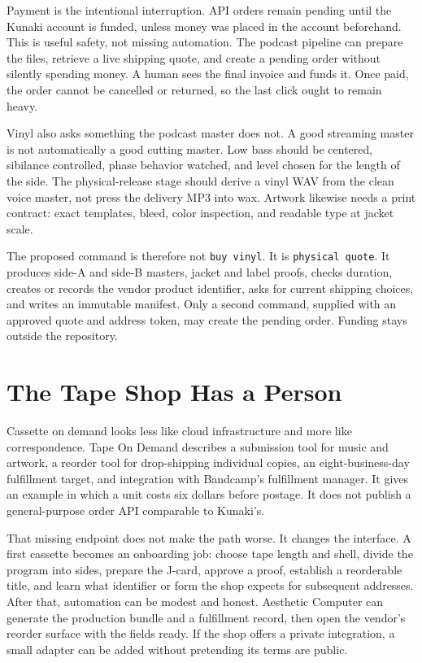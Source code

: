 \documentclass[11pt,letterpaper]{article}
\begin{document}
Payment is the intentional interruption. API orders remain pending until the Kunaki account is funded, unless money was placed in the account beforehand. This is useful safety, not missing automation. The podcast pipeline can prepare the files, retrieve a live shipping quote, and create a pending order without silently spending money. A human sees the final invoice and funds it. Once paid, the order cannot be cancelled or returned, so the last click ought to remain heavy.

Vinyl also asks something the podcast master does not. A good streaming master is not automatically a good cutting master. Low bass should be centered, sibilance controlled, phase behavior watched, and level chosen for the length of the side. The physical-release stage should derive a vinyl WAV from the clean voice master, not press the delivery MP3 into wax. Artwork likewise needs a print contract: exact templates, bleed, color inspection, and readable type at jacket scale.

The proposed command is therefore not \texttt{buy vinyl}. It is \texttt{physical quote}. It produces side-A and side-B masters, jacket and label proofs, checks duration, creates or records the vendor product identifier, asks for current shipping choices, and writes an immutable manifest. Only a second command, supplied with an approved quote and address token, may create the pending order. Funding stays outside the repository.

\section{The Tape Shop Has a Person}

Cassette on demand looks less like cloud infrastructure and more like correspondence. Tape On Demand describes a submission tool for music and artwork, a reorder tool for drop-shipping individual copies, an eight-business-day fulfillment target, and integration with Bandcamp's fulfillment manager. It gives an example in which a unit costs six dollars before postage. It does not publish a general-purpose order API comparable to Kunaki's.

That missing endpoint does not make the path worse. It changes the interface. A first cassette becomes an onboarding job: choose tape length and shell, divide the program into sides, prepare the J-card, approve a proof, establish a reorderable title, and learn what identifier or form the shop expects for subsequent addresses. After that, automation can be modest and honest. Aesthetic Computer can generate the production bundle and a fulfillment record, then open the vendor's reorder surface with the fields ready. If the shop offers a private integration, a small adapter can be added without pretending its terms are public.
\end{document}
